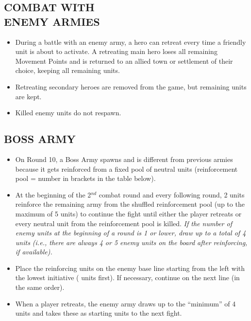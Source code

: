 \begin{multicols*}{2}
\subsection*{\MakeUppercase{Combat with\\Enemy Armies}}

\begin{itemize}
  \item During a battle with an enemy army, a hero can retreat every time a friendly unit is about to activate.
    A retreating main hero loses all remaining Movement Points and is returned to an allied town or settlement of their choice, keeping all remaining units.
  \item Retreating secondary heroes are removed from the game, but remaining units are kept.
  \item Killed enemy units do not respawn.
\end{itemize}

\subsection*{\MakeUppercase{Boss Army}}

\begin{itemize}
  \item On Round 10, a Boss Army spawns and is different from previous armies because it gets reinforced from a fixed pool of neutral units (reinforcement pool = number in brackets in the table below).
  \item At the beginning of the 2$^{nd}$ combat round and every following round, 2 units reinforce the remaining army from the shuffled reinforcement pool (up to the maximum of 5 units) to continue the fight until either the player retreats or every neutral unit from the reinforcement pool is killed. \textit{If the number of enemy units at the beginning of a round is 1 or lower, draw up to a total of 4 units (i.e., there are always 4 or 5 enemy units on the board after reinforcing, if available).}
  \item Place the reinforcing units on the enemy base line starting from the left with the lowest initiative ( units first). If necessary, continue on the next line (in the same order).
  \item When a player retreats, the enemy army draws up to the ``minimum'' of 4 units and takes these as starting units to the next fight.
\end{itemize}

\end{multicols*}

